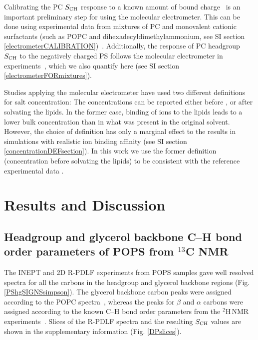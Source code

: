 \documentclass[journal=jpcbfk,manuscript=article]{achemso}
\begin{document}
Calibrating the PC $S_{\rm CH}$ response to a known amount of bound charge~\cite{catte16,melcr18} is an important preliminary step for using the molecular electrometer.
This can be done using experimental data from mixtures of PC and
monovalent cationic surfactants (such as POPC and dihexadecyldimethylammonium,
see SI section \ref{electrometerCALIBRATION})~\cite{scherer89,melcr18}.
Additionally, the response of PC headgroup $S_{\rm CH}$ to the negatively
charged PS follows the molecular electrometer in experiments~\cite{scherer87},
which we also quantify here (see SI section \ref{electrometerFORmixtures}).

Studies applying the molecular electrometer have used two different definitions for salt concentration:
The concentrations can be reported either before \cite{akutsu81,roux90,catte16}, or after \cite{altenbach84,melcr18} solvating the lipids.
In the former case, binding of ions to the lipids leads to a lower bulk concentration than in what was present in the original solvent.
However, the choice of definition has only a marginal effect
to the results in simulations with realistic ion binding affinity
(see SI section \ref{concentrationDEFsection}).
In this work we use the former definition (concentration before solvating the lipids) to be consistent with the reference
experimental data \cite{roux90}.

\section{Results and Discussion}

\subsection{Headgroup and glycerol backbone C--H bond order parameters of POPS from $^{13}$C NMR}
The INEPT and 2D R-PDLF experiments from POPS samples gave well resolved spectra for all the
carbons in the headgroup and glycerol backbone regions (Fig. \ref{PShgSIGNSsimpson}).
The glycerol backbone carbon peaks were assigned according to the POPC spectra~\cite{ferreira13}, whereas
the peaks for $\beta$ and $\alpha$ carbons were assigned according to the
known C--H bond order parameters from the $^2$H\,NMR experiments~\cite{browning80}.
Slices of the R-PDLF spectra and the resulting  $S_{\rm CH}$ values
are shown in the supplementary information (Fig. \ref{DPslices}). 
\end{document}
